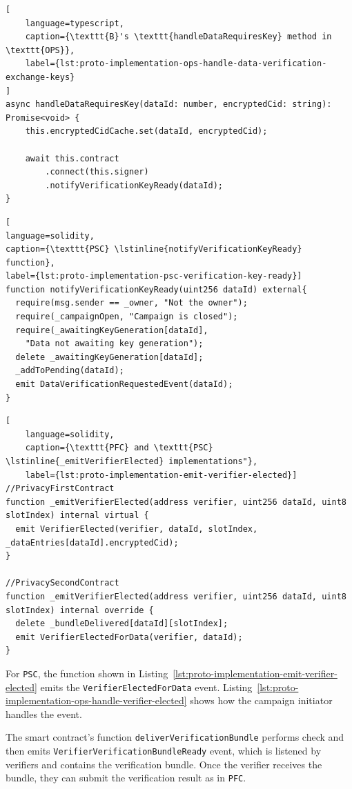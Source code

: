 \begin{lstlisting}[
    language=typescript,
    caption={\texttt{B}'s \texttt{handleDataRequiresKey} method in \texttt{OPS}},
    label={lst:proto-implementation-ops-handle-data-verification-exchange-keys}
]
async handleDataRequiresKey(dataId: number, encryptedCid: string): Promise<void> {
    this.encryptedCidCache.set(dataId, encryptedCid);

    await this.contract
        .connect(this.signer)
        .notifyVerificationKeyReady(dataId);
}
\end{lstlisting}

\begin{lstlisting}[
language=solidity,
caption={\texttt{PSC} \lstinline{notifyVerificationKeyReady} function},
label={lst:proto-implementation-psc-verification-key-ready}]
function notifyVerificationKeyReady(uint256 dataId) external{
  require(msg.sender == _owner, "Not the owner");
  require(_campaignOpen, "Campaign is closed");
  require(_awaitingKeyGeneration[dataId],
    "Data not awaiting key generation");
  delete _awaitingKeyGeneration[dataId];
  _addToPending(dataId);
  emit DataVerificationRequestedEvent(dataId);
}
\end{lstlisting}

\begin{lstlisting}[
    language=solidity,
    caption={\texttt{PFC} and \texttt{PSC} \lstinline{_emitVerifierElected} implementations"},
    label={lst:proto-implementation-emit-verifier-elected}]
//PrivacyFirstContract
function _emitVerifierElected(address verifier, uint256 dataId, uint8 slotIndex) internal virtual {
  emit VerifierElected(verifier, dataId, slotIndex, _dataEntries[dataId].encryptedCid);
}

//PrivacySecondContract
function _emitVerifierElected(address verifier, uint256 dataId, uint8 slotIndex) internal override {
  delete _bundleDelivered[dataId][slotIndex];
  emit VerifierElectedForData(verifier, dataId);
}
\end{lstlisting}

For \texttt{PSC}, the function shown in Listing~\ref{lst:proto-implementation-emit-verifier-elected} emits the \texttt{VerifierElectedForData} event.
Listing~\ref{lst:proto-implementation-ops-handle-verifier-elected} shows how the campaign initiator handles the event.


The smart contract's function \lstinline{deliverVerificationBundle} performs check and then emits \texttt{VerifierVerificationBundleReady} event, which is listened by verifiers and contains the verification bundle.
Once the verifier receives the bundle, they can submit the verification result as in \texttt{PFC}.

